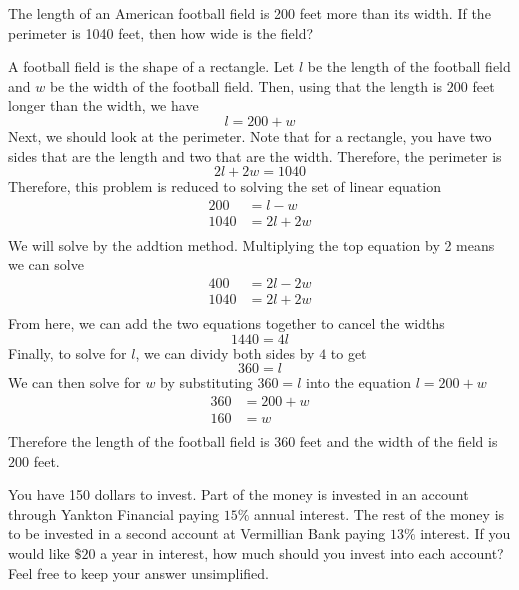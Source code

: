 \documentclass[addpoints,12pt]{exam}
\begin{document}
\begin{questions}
\question The length of an American football field is 200 feet more than its width. If the perimeter is 1040 feet, then how wide is the field? 
\begin{solution}
    A football field is the shape of a rectangle. Let $l$ be the length of the football field and $w$ be the width of the football field. Then, using that the length is $200$ feet longer than the width, we have 
		\[
			l = 200+w
		\]
Next, we should look at the perimeter. Note that for a rectangle, you have two sides that are the length and two that are the width. Therefore, the perimeter is 
\[
2l+2w= 1040
\]
Therefore, this problem is reduced to solving the set of linear equation 
\begin{align*}
	200 &  = l-w \\
	1040 & = 2l + 2w \\
\end{align*}
We will solve by the addtion method. Multiplying the top equation by 2 means we can solve 
\begin{align*}
	400 &  = 2l-2w \\
	1040 & = 2l + 2w \\
\end{align*}
From here, we can add the two equations together to cancel the widths 
\[1440 = 4l \]
Finally, to solve for $l$, we can dividy both sides by $4$ to get 
\[
360 = l
\]
We can then solve for $w$ by substituting $360 = l $ into the equation $l = 200 +w$
\begin{align*}
	360 & = 200 +w \\
	160 & = w \\
\end{align*}
Therefore the length of the football field is $360$ feet and the width of the field is $200 $ feet.

\end{solution}


\question You have 150 dollars to invest. Part of the money is invested in an account through Yankton Financial paying $15\%$ annual interest. The rest of the money is to be invested in a second account at Vermillian Bank paying $13\%$ interest. If you would like $\$20$ a year in interest, how much should you invest into each account? Feel free to keep your answer unsimplified. 


\end{questions}
\end{document}
